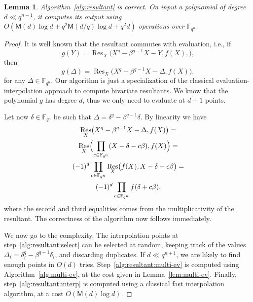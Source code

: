 \documentclass{sig-alternate}
\newcommand{\ff}[1]{\mathbb{F}_{#1}}
\newcommand{\dd}{d}
\newcommand{\qq}{q}
\newcommand{\nn}{n}
\newcommand{\qn}{{\qq^\nn}}
\newcommand{\extf}{\ff{\qn}}
\newcommand{\Mul}{\mathsf{M}}
\DeclareMathOperator{\Res}{Res}
\newcounter{algo}
\newtheorem{Lem}{Lemma}
\begin{document}
\begin{Lem}
  Algorithm~\ref{alg:resultant} is correct. On input a polynomial of
  degree $d\ll\qq^{\nn-1}$, it computes its output using $O(\Mul(\dd)
  \log\dd + \qq^2\Mul(\dd/\qq)\log\dd + \qq^2\dd)$ operations over
  $\extf$.
\end{Lem}
\begin{proof}
  It is well known that the resultant commutes with evaluation, i.e., if
  \begin{equation}
    g(Y) = \Res_X\bigl(X^\qq-\beta^{\qq-1}X-Y,f(X),\bigr),
  \end{equation}
  then
  \begin{equation}
    g(\Delta) = \Res_X\bigl(X^\qq - \beta^{\qq-1}X -\Delta , f(X)\bigr),
  \end{equation}
  for any $\Delta\in\extf$. Our algorithm is just a specialization of
  the classical evaluation-interpolation approach to compute bivariate
  resultants. We know that the polynomial $g$ has degree $\dd$, thus
  we only need to evaluate at $d+1$ points.

  Let now $\delta\in\extf$ be such that
  $\Delta=\delta^\qq-\beta^{\qq-1}\delta$. By linearity we have
  \begin{multline}
    \label{eq:lin-resultant}
    \Res_X\bigl(X^\qq-\beta^{\qq-1}X-\Delta,f(X)\bigr) =\\
    \Res_X\Bigl(  \prod_{c\in\extf}(X-\delta - c\beta),f(X) \Bigr) =\\
    (-1)^{\dd} \prod_{c\in\extf} \Res_X\bigl(f(X), X-\delta - c\beta\bigr) =\\
     (-1)^{\dd} \prod_{c\in\extf} f(\delta+c\beta),
  \end{multline}
  where the second and third equalities comes from the
  multiplicativity of the resultant. The correctness of the algorithm
  now follows immediately.

  We now go to the complexity. The interpolation points at
  step~\ref{alg:resultant:select} can be selected at random, keeping
  track of the values $\Delta_i=\delta_i^\qq-\beta^{\qq-1}\delta_i$,
  and discarding duplicates. If $\dd\ll\qq^{n+1}$, we are likely to
  find enough points in $O(d)$
  tries. Step~\ref{alg:resultant:multi-ev} is computed using
  Algorithm~\ref{alg:multi-ev}, at the cost given in
  Lemma~\ref{lem:multi-ev}. Finally, step~\ref{alg:resultant:interp}
  is computed using a classical fast interpolation algorithm, at a
  cost $O(\Mul(d)\log d)$.
\end{proof}
\end{document}
